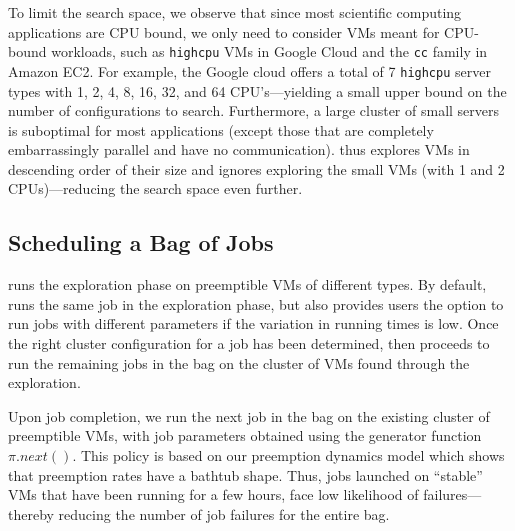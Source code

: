 
To limit the search space, we observe that since most scientific computing applications are CPU bound, we only need to consider VMs meant for CPU-bound workloads, such as \texttt{highcpu} VMs in Google Cloud and the \texttt{cc} family in Amazon EC2.
For example, the Google cloud offers a total of 7 \texttt{highcpu} server types with 1, 2, 4, 8, 16, 32, and 64 CPU's---yielding a small upper bound on the number of configurations to search. 
Furthermore, a large cluster of small servers is suboptimal for most applications (except those that are completely embarrassingly parallel and have no communication).
\sysname thus explores VMs in descending order of their size and ignores exploring the small VMs (with 1 and 2 CPUs)---reducing the search space even further. 


\vspace*{\subsecspace}
\subsection{Scheduling a Bag of Jobs}

\sysname runs the exploration phase on preemptible VMs of different types. 
By default, \sysname runs the same job in the exploration phase, but also provides users the option to run jobs with different parameters if the variation in running times is low.
Once the right cluster configuration for a job has been determined, \sysname then proceeds to run the remaining jobs in the bag on the cluster of VMs found through the exploration.


Upon job completion, we run the next job in the bag on the existing cluster of preemptible VMs, with job parameters obtained using the generator function $\pi.next()$. 
This policy is based on our preemption dynamics model which shows that preemption rates have a bathtub shape.
Thus, jobs launched on ``stable'' VMs that have been running for a few hours, face low likelihood of failures---thereby reducing the number of job failures for the entire bag. 

